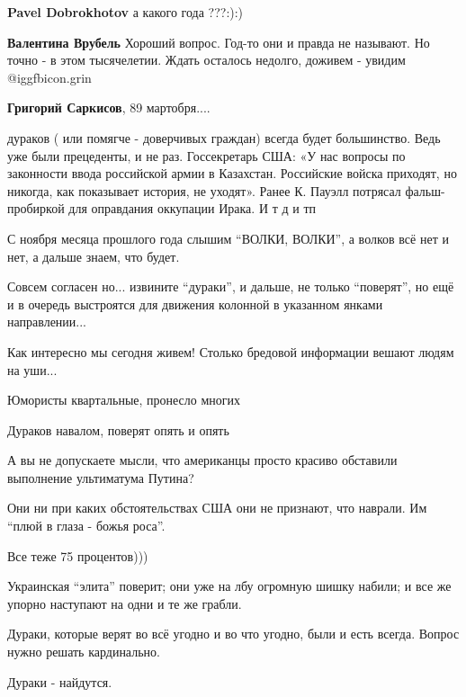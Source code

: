\begin{itemize}
\begin{itemize}
\textbf{Pavel Dobrokhotov} а какого года ???:):)

\textbf{Валентина Врубель} Хороший вопрос. Год-то они и правда не называют. Но точно - в этом тысячелетии. Ждать осталось недолго, доживем - увидим @igg{fbicon.grin} 

\textbf{Григорий Саркисов}, 89 мартобря....
\end{itemize} %


дураков ( или помягче - доверчивых граждан) всегда будет большинство. Ведь уже
были прецеденты, и не раз. Госсекретарь США: «У нас вопросы по законности
ввода российской армии в Казахстан. Российские войска приходят, но никогда, как
показывает история, не уходят». Ранее К. Пауэлл потрясал фальш-пробиркой для
оправдания оккупации Ирака. И т д и тп



С ноября месяца прошлого года слышим \enquote{ВОЛКИ, ВОЛКИ}, а волков всё нет и нет, а
дальше знаем, что будет.



Совсем согласен но... извините \enquote{дураки}, и дальше, не только \enquote{поверят}, но ещё и
в очередь выстроятся для движения колонной в указанном янками направлении...

Как интересно мы сегодня живем! Столько бредовой информации вешают людям на уши...

Юмористы квартальные, пронесло многих

Дураков навалом, поверят опять и опять

А вы не допускаете мысли, что американцы просто красиво обставили выполнение ультиматума Путина?

Они ни при каких обстоятельствах США они не признают, что наврали. Им \enquote{плюй в глаза - божья роса}.

Все теже 75 процентов)))

Украинская \enquote{элита} поверит; они уже на лбу огромную шишку набили; и все же упорно наступают на одни и те же грабли.

Дураки, которые верят во всё угодно и во что угодно, были и есть всегда. Вопрос нужно решать кардинально.

Дураки - найдутся.


\end{itemize}
